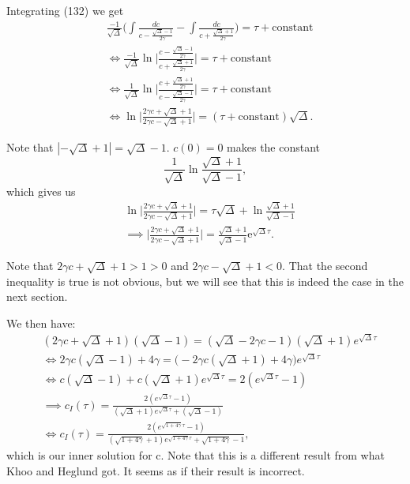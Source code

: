 \documentclass[12pt]{article}
\begin{document}
Integrating (132) we get
\begin{align}
&\frac{-1}{\sqrt{\Delta}}
\Big( \int \frac{dc}{c - \frac{\sqrt{\Delta} - 1}{2 \gamma}} -
      \int \frac{dc}{c + \frac{\sqrt{\Delta} + 1}{2 \gamma}}
\Big) = \tau + \text{constant} \\
&\iff \frac{-1}{\sqrt{\Delta}}
      \ln \bigg|\frac{c - \frac{\sqrt{\Delta}-1}{2\gamma}}
                     {c + \frac{\sqrt{\Delta}+1}{2\gamma}} \bigg|
 = \tau + \text{constant} \\
&\iff \frac{1}{\sqrt{\Delta}}
      \ln \bigg|\frac{c + \frac{\sqrt{\Delta}+1}{2\gamma}}
                     {c - \frac{\sqrt{\Delta}-1}{2\gamma}} \bigg|
 = \tau + \text{constant} \\
&\iff  \ln \bigg|\frac{2\gamma c + \sqrt{\Delta}+1}
                      {2\gamma c - \sqrt{\Delta}+1} \bigg|
 = (\tau + \text{constant}) \sqrt{\Delta}.
\end{align}

Note that $|-\sqrt{\Delta}+1| = \sqrt{\Delta} - 1$. $c(0)=0$ makes the constant
\begin{equation}
\frac{1}{\sqrt{\Delta}} \ln \frac{\sqrt{\Delta}+1}{{\sqrt{\Delta}-1}},
\end{equation}
which gives us
\begin{align}
&\ln \bigg|\frac{2\gamma c + \sqrt{\Delta}+1}
                {2\gamma c - \sqrt{\Delta}+1} \bigg|
 = \tau \sqrt{\Delta} + \ln \frac{\sqrt{\Delta}+1}{{\sqrt{\Delta}-1}}\\
&\implies \bigg|\frac{2\gamma c + \sqrt{\Delta}+1}
                     {2\gamma c - \sqrt{\Delta}+1} \bigg|
 = \frac{\sqrt{\Delta}+1}{{\sqrt{\Delta}-1}} \mathrm{e}^{\sqrt{\Delta} \tau}.
\end{align}

Note that $2 \gamma c + \sqrt{\Delta} + 1 > 1 > 0$ and
$2 \gamma c - \sqrt{\Delta} + 1 < 0$. That the second inequality is
true is not obvious, but we will see that this is indeed the case in
the next section.

We then have:
\begin{align}
&(2\gamma c + \sqrt{\Delta} + 1)(\sqrt{\Delta} - 1) =
   (\sqrt{\Delta} - 2\gamma c - 1)(\sqrt{\Delta} + 1) e^{\sqrt{\Delta} \tau} \\
&\iff 2\gamma c (\sqrt{\Delta} - 1) + 4 \gamma =
  \Big( -2\gamma c(\sqrt{\Delta} + 1) + 4\gamma \Big) e^{\sqrt{\Delta} \tau} \\
&\iff c (\sqrt{\Delta} - 1) + c (\sqrt{\Delta} + 1) e^{\sqrt{\Delta} \tau} =
   2(e^{\sqrt{\Delta} \tau} - 1) \\
&\implies c_I(\tau) =
  \frac{2(e^{\sqrt{\Delta} \tau} - 1)}
       {  (\sqrt{\Delta} + 1) e^{\sqrt{\Delta} \tau} + (\sqrt{\Delta} - 1)} \\
&\iff c_I(\tau) =
  \frac{2(e^{\sqrt{1+4\gamma} \tau} - 1)}
       {(\sqrt{1+4\gamma} + 1) e^{\sqrt{1+4\gamma} \tau} + \sqrt{1+4\gamma} - 1},
\end{align}
which is our inner solution for c. Note that this is a different
result from what Khoo and Heglund got. It seems as if their result is
incorrect.
\end{document}
